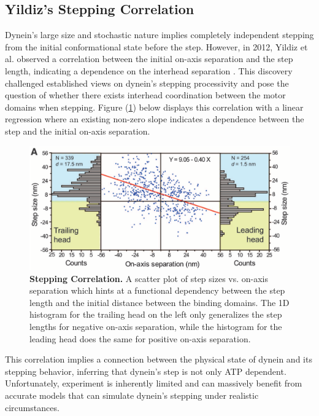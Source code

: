 \subsection{Yildiz's Stepping Correlation}

Dynein's large size and stochastic nature implies completely independent stepping from the initial conformational state before the step. However, in 2012, Yildiz et al. observed a correlation between the initial on-axis separation and the step length, indicating a dependence on the interhead separation \cite{Dewitt2012}. This discovery challenged established views on dynein's stepping processivity and pose the question of whether there exists interhead coordination between the motor domains when stepping. Figure (\ref{fig:YildizCorrelation}) below displays this correlation with a linear regression where an existing non-zero slope indicates a dependence between the step and the initial on-axis separation.

\begin{figure}[H]
	\centering
	\includegraphics[width=1\columnwidth]{Figures/Yildiz_stepping.png}
	\caption[Stepping Correlation]{\textbf{Stepping Correlation.} A scatter plot of step sizes vs. on-axis separation which hints at a functional dependency between the step  length and the initial distance between the binding domains. The 1D histogram for the trailing head on the left only generalizes the step lengths for negative on-axis separation, while the histogram for the leading head does the same for positive on-axis separation. \cite{Dewitt2012} }
	\label{fig:YildizCorrelation}
\end{figure}

This correlation implies a connection between the physical state of dynein and its stepping behavior, inferring that dynein's step is not only ATP dependent. Unfortunately, experiment is inherently limited and can massively benefit from accurate models that can simulate dynein's stepping under realistic circumstances.


